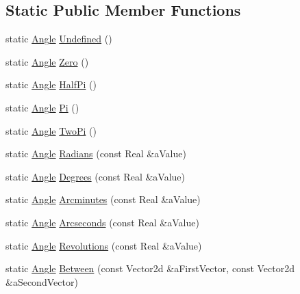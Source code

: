 \subsection*{Static Public Member Functions}
\begin{DoxyCompactItemize}
\item 
static \hyperlink{classlibrary_1_1physics_1_1units_1_1_angle}{Angle} \hyperlink{classlibrary_1_1physics_1_1units_1_1_angle_a9c9a16c58d7e1e95e38cf2adf888f334}{Undefined} ()
\item 
static \hyperlink{classlibrary_1_1physics_1_1units_1_1_angle}{Angle} \hyperlink{classlibrary_1_1physics_1_1units_1_1_angle_a3dcf6f9bcee4ae440d36859c30481d2b}{Zero} ()
\item 
static \hyperlink{classlibrary_1_1physics_1_1units_1_1_angle}{Angle} \hyperlink{classlibrary_1_1physics_1_1units_1_1_angle_a921a547ba74630c813201cb2126239cb}{Half\+Pi} ()
\item 
static \hyperlink{classlibrary_1_1physics_1_1units_1_1_angle}{Angle} \hyperlink{classlibrary_1_1physics_1_1units_1_1_angle_a506b763d8a160b8b1ce5fb33a87119a9}{Pi} ()
\item 
static \hyperlink{classlibrary_1_1physics_1_1units_1_1_angle}{Angle} \hyperlink{classlibrary_1_1physics_1_1units_1_1_angle_a7ff0185d33abbb7b3fdcbef1bbb19f74}{Two\+Pi} ()
\item 
static \hyperlink{classlibrary_1_1physics_1_1units_1_1_angle}{Angle} \hyperlink{classlibrary_1_1physics_1_1units_1_1_angle_ac065fbde3c625159cf21153c23c3045b}{Radians} (const Real \&a\+Value)
\item 
static \hyperlink{classlibrary_1_1physics_1_1units_1_1_angle}{Angle} \hyperlink{classlibrary_1_1physics_1_1units_1_1_angle_a20b061534d7d24f807781a06b191603b}{Degrees} (const Real \&a\+Value)
\item 
static \hyperlink{classlibrary_1_1physics_1_1units_1_1_angle}{Angle} \hyperlink{classlibrary_1_1physics_1_1units_1_1_angle_a52f391389a2d59b327b5206e2ee24645}{Arcminutes} (const Real \&a\+Value)
\item 
static \hyperlink{classlibrary_1_1physics_1_1units_1_1_angle}{Angle} \hyperlink{classlibrary_1_1physics_1_1units_1_1_angle_a04df20ae83aa3609c7e7ac5eaf013db9}{Arcseconds} (const Real \&a\+Value)
\item 
static \hyperlink{classlibrary_1_1physics_1_1units_1_1_angle}{Angle} \hyperlink{classlibrary_1_1physics_1_1units_1_1_angle_a2e712e11187dec11a781d457a3f949dc}{Revolutions} (const Real \&a\+Value)
\item 
static \hyperlink{classlibrary_1_1physics_1_1units_1_1_angle}{Angle} \hyperlink{classlibrary_1_1physics_1_1units_1_1_angle_ae12bd433f957f0e297c4d2e5bc3d22cc}{Between} (const Vector2d \&a\+First\+Vector, const Vector2d \&a\+Second\+Vector)

\end{DoxyCompactItemize}
